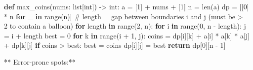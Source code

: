 \documentclass[11pt]{article}
\newenvironment{Shaded}{\begin{snugshade}}{\end{snugshade}}
\newcommand{\BuiltInTok}[1]{\textcolor[rgb]{0.50,0.55,0.55}{#1}}
\newcommand{\CommentTok}[1]{\textcolor[rgb]{0.48,0.49,0.49}{#1}}
\newcommand{\ControlFlowTok}[1]{\textcolor[rgb]{0.99,0.74,0.29}{\textbf{#1}}}
\newcommand{\DecValTok}[1]{\textcolor[rgb]{0.96,0.45,0.00}{#1}}
\newcommand{\KeywordTok}[1]{\textcolor[rgb]{0.81,0.81,0.76}{\textbf{#1}}}
\newcommand{\NormalTok}[1]{\textcolor[rgb]{0.81,0.81,0.76}{#1}}
\newcommand{\OperatorTok}[1]{\textcolor[rgb]{0.81,0.81,0.76}{#1}}
\begin{document}

\begin{Shaded}
\begin{Highlighting}[]
\KeywordTok{def}\NormalTok{ max\_coins(nums: }\BuiltInTok{list}\NormalTok{[}\BuiltInTok{int}\NormalTok{]) }\OperatorTok{{-}\textgreater{}} \BuiltInTok{int}\NormalTok{:}
\NormalTok{    a }\OperatorTok{=}\NormalTok{ [}\DecValTok{1}\NormalTok{] }\OperatorTok{+}\NormalTok{ nums }\OperatorTok{+}\NormalTok{ [}\DecValTok{1}\NormalTok{]}
\NormalTok{    n }\OperatorTok{=} \BuiltInTok{len}\NormalTok{(a)}
\NormalTok{    dp }\OperatorTok{=}\NormalTok{ [[}\DecValTok{0}\NormalTok{] }\OperatorTok{*}\NormalTok{ n }\ControlFlowTok{for}\NormalTok{ \_ }\KeywordTok{in} \BuiltInTok{range}\NormalTok{(n)]}
    \CommentTok{\# length = gap between boundaries i and j (must be \textgreater{}= 2 to contain a balloon)}
    \ControlFlowTok{for}\NormalTok{ length }\KeywordTok{in} \BuiltInTok{range}\NormalTok{(}\DecValTok{2}\NormalTok{, n):}
        \ControlFlowTok{for}\NormalTok{ i }\KeywordTok{in} \BuiltInTok{range}\NormalTok{(}\DecValTok{0}\NormalTok{, n }\OperatorTok{{-}}\NormalTok{ length):}
\NormalTok{            j }\OperatorTok{=}\NormalTok{ i }\OperatorTok{+}\NormalTok{ length}
\NormalTok{            best }\OperatorTok{=} \DecValTok{0}
            \ControlFlowTok{for}\NormalTok{ k }\KeywordTok{in} \BuiltInTok{range}\NormalTok{(i }\OperatorTok{+} \DecValTok{1}\NormalTok{, j):}
\NormalTok{                coins }\OperatorTok{=}\NormalTok{ dp[i][k] }\OperatorTok{+}\NormalTok{ a[i] }\OperatorTok{*}\NormalTok{ a[k] }\OperatorTok{*}\NormalTok{ a[j] }\OperatorTok{+}\NormalTok{ dp[k][j]}
                \ControlFlowTok{if}\NormalTok{ coins }\OperatorTok{\textgreater{}}\NormalTok{ best:}
\NormalTok{                    best }\OperatorTok{=}\NormalTok{ coins}
\NormalTok{            dp[i][j] }\OperatorTok{=}\NormalTok{ best}
    \ControlFlowTok{return}\NormalTok{ dp[}\DecValTok{0}\NormalTok{][n }\OperatorTok{{-}} \DecValTok{1}\NormalTok{]}
\end{Highlighting}
\end{Shaded}

** Error-prone spots:**
\end{document}
